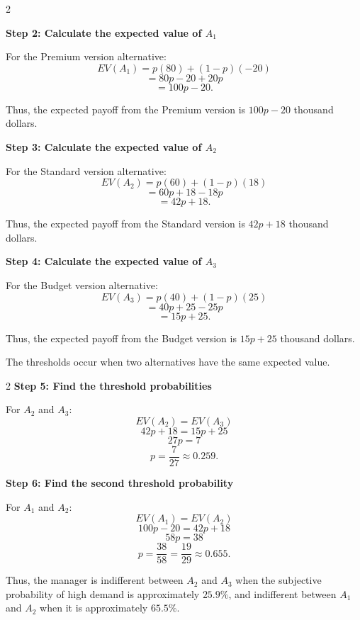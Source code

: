 	\noindent
	\setlength{\columnseprule}{0.4pt}
	\begin{multicols}{2}
		\vspace{0pt}
		
		\textbf{Step 2: Calculate the expected value of $A_1$}
		
		For the Premium version alternative:
		\[
		EV(A_1)
		=
		p(80)
		+
		(1-p)(-20)
		\]
		\[
		=
		80p-20+20p
		\]
		\[
		=
		100p-20.
		\]
		
		Thus, the expected payoff from the Premium version is
		$100p-20$ thousand dollars.
		
		\textbf{Step 3: Calculate the expected value of $A_2$}
		
		For the Standard version alternative:
		\[
		EV(A_2)
		=
		p(60)
		+
		(1-p)(18)
		\]
		\[
		=
		60p+18-18p
		\]
		\[
		=
		42p+18.
		\]
		
		Thus, the expected payoff from the Standard version is
		$42p+18$ thousand dollars.
		
		\columnbreak
		
		\textbf{Step 4: Calculate the expected value of $A_3$}
		
		For the Budget version alternative:
		\[
		EV(A_3)
		=
		p(40)
		+
		(1-p)(25)
		\]
		\[
		=
		40p+25-25p
		\]
		\[
		=
		15p+25.
		\]
		
		Thus, the expected payoff from the Budget version is
		$15p+25$ thousand dollars.
	\end{multicols}
	
	The thresholds occur when two alternatives have the same expected value.
	
	\noindent
	\setlength{\columnseprule}{0.4pt}
	\begin{multicols}{2}
		\textbf{Step 5: Find the threshold probabilities}
		
		For $A_2$ and $A_3$:
		\[
		EV(A_2)=EV(A_3)
		\]
		\[
		42p+18=15p+25
		\]
		\[
		27p=7
		\]
		\[
		p=\frac{7}{27}
		\approx0.259.
		\]
		
		\columnbreak
		
		\textbf{Step 6: Find the second threshold probability}
		
		For $A_1$ and $A_2$:
		\[
		EV(A_1)=EV(A_2)
		\]
		\[
		100p-20=42p+18
		\]
		\[
		58p=38
		\]
		\[
		p=\frac{38}{58}
		=\frac{19}{29}
		\approx0.655.
		\]
		
	\end{multicols}
	
	Thus, the manager is indifferent between $A_2$ and $A_3$ when the
	subjective probability of high demand is approximately $25.9\%$,
	and indifferent between $A_1$ and $A_2$ when it is approximately
	$65.5\%$.
	
